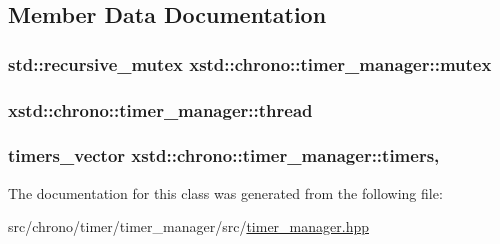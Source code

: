 \subsection{Member Data Documentation}
\hypertarget{classxstd_1_1chrono_1_1timer__manager_afe2d386a7849d456e6fffda583bb73f2}{
\subsubsection[{mutex}]{\setlength{\rightskip}{0pt plus 5cm}std\-::recursive\-\_\-mutex xstd\-::chrono\-::timer\-\_\-manager\-::mutex\hspace{0.3cm}{\ttfamily [private]}}}\label{classxstd_1_1chrono_1_1timer__manager_afe2d386a7849d456e6fffda583bb73f2}
\hypertarget{classxstd_1_1chrono_1_1timer__manager_a8f037197c9a2e80e1d0a38695808766e}{
\subsubsection[{thread}]{ xstd\-::chrono\-::timer\-\_\-manager\-::thread\hspace{0.3cm}{\ttfamily [private]}}}\label{classxstd_1_1chrono_1_1timer__manager_a8f037197c9a2e80e1d0a38695808766e}
\hypertarget{classxstd_1_1chrono_1_1timer__manager_a9eae3cef8d5d2e72a68dfb9e2a0130ee}{
\subsubsection[{timers}]{\setlength{\rightskip}{0pt plus 5cm}timers\-\_\-vector xstd\-::chrono\-::timer\-\_\-manager\-::timers\hspace{0.3cm}{\ttfamily [mutable]}, {\ttfamily [private]}}}\label{classxstd_1_1chrono_1_1timer__manager_a9eae3cef8d5d2e72a68dfb9e2a0130ee}


The documentation for this class was generated from the following file\-:\begin{DoxyCompactItemize}
\item 
src/chrono/timer/timer\-\_\-manager/src/\hyperlink{timer__manager_8hpp}{timer\-\_\-manager.\-hpp}\end{DoxyCompactItemize}
